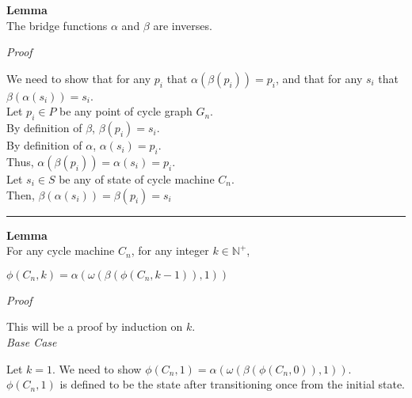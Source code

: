 \documentclass[a4paper,12pt]{article}
\begin{document}
\begin{tcolorbox}
\textbf{Lemma}\\
The bridge functions $\alpha$ and $\beta$ are inverses.
\end{tcolorbox}

\noindent
\textit{Proof}

\noindent We need to show that for any $p_i$ that $\alpha(\beta(p_i)) = p_i$, and that for any $s_i$ that $\beta(\alpha(s_i)) = s_i$.\\

\noindent Let $p_i \in P$ be any point of cycle graph $G_n$.\\ 

\noindent By definition of $\beta$, $\beta(p_i) = s_i$.\\

\noindent By definition of $\alpha$, $\alpha(s_i) = p_i$.\\

\noindent Thus, $\alpha(\beta(p_i)) = \alpha(s_i) = p_i$.\\

\noindent Let $s_i \in S$ be any of state of cycle machine $C_n$.\\

\noindent Then, $\beta(\alpha(s_i)) = \beta(p_i) = s_i$

\noindent 
\begin{center}
\noindent\rule{8cm}{0.4pt}
\end{center}





\begin{tcolorbox}
\textbf{Lemma}\\
For any cycle machine $C_n$, for any integer $k \in \mathbb{N^+}$,

\begin{center}
$\phi(C_n, k) = 
\alpha(\omega(\beta(\phi(C_n, k - 1)), 1))$
\end{center}
\end{tcolorbox}

\noindent
\textit{Proof}

\noindent This will be a proof by induction on $k$.\\


\noindent
\textit{Base Case}

\noindent Let $k = 1$. We need to show $\phi(C_n, 1) = \alpha(\omega(\beta(\phi(C_n, 0)), 1))$.\\

\noindent $\phi(C_n, 1)$ is defined to be the state after transitioning once from the initial state.\\
\end{document}
